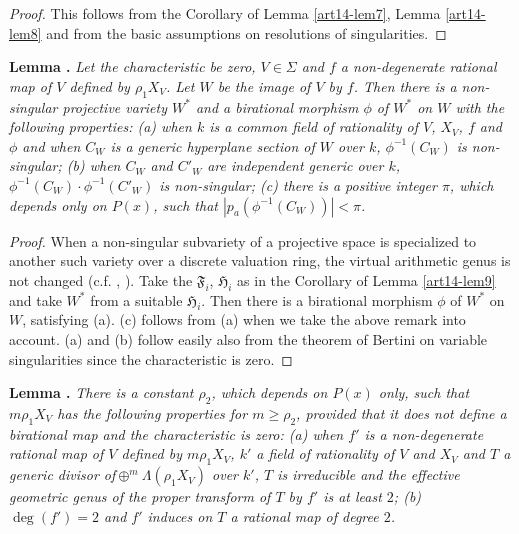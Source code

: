 \begin{proof}
This follows from the Corollary of Lemma \ref{art14-lem7}, Lemma \ref{art14-lem8} and from the basic assumptions on resolutions of singularities.
\end{proof}

\medskip
\noindent
{\bf Lemma .\label{art14-lem9}}
{\em 
Let the characteristic be zero, $V\in\Sigma$ and $f$ a non-degene\-rate rational map of $V$ defined by $\rho_{1}X_{V}$. Let $W$ be the image of $V$ by $f$. Then there is a non-singular projective variety $W^{*}$ and a birational morphism $\phi$ of $W^{*}$ on $W$ with the following properties: {\rm(a)} when $k$ is a common field of rationality of $V$, $X_{V}$, $f$ and $\phi$ and when $C_{W}$ is a generic hyperplane section of $W$ over $k$, $\phi^{-1}(C_{W})$ is non-singular; {\rm(b)} when $C_{W}$ and $C'_{W}$ are independent generic over $k$, $\phi^{-1}(C_{W})\cdot \phi^{-1}(C'_{W})$ is non-singular; {\rm(c)} there is a positive integer $\pi$, which depends only on $P(x)$, such that $|p_{a}(\phi^{-1}(C_{W}))|<\pi$.}

\begin{proof}
When a non-singular subvariety of a projective space is specialized to another such variety over a discrete valuation ring, the virtual arithmetic genus is not changed (c.f. \cite{art14-key2}, \cite{art14-key4}). Take the $\mathfrak{F}_{i}$, $\mathfrak{H}_{i}$ as in the Corollary of Lemma \ref{art14-lem9} and take $W^{*}$ from a suitable $\mathfrak{H}_{i}$. Then there is a birational morphism $\phi$ of $W^{*}$ on $W$, satisfying (a). (c) follows from (a) when we take the above remark into account. (a) and (b) follow easily also from the theorem of Bertini on variable singularities since the characteristic is zero.
\end{proof}

\smallskip
\noindent
{\bf Lemma .\label{art14-lem10}}
{\em There is a constant $\rho_{2}$, which depends on $P(x)$ only, such that $m\rho_{1}X_{V}$ has the following properties for $m\geq \rho_{2}$, provided that it does not define a birational map and the characteristic is zero: {\rm(a)} when $f'$ is a non-degenerate rational map of $V$ defined by $m\rho_{1}X_{V}$, $k'$ a field of rationality of $V$ and $X_{V}$ and $T$ a generic divisor of\pageoriginale $\oplus^{m}\Lambda(\rho_{1}X_{V})$ over $k'$, $T$ is irreducible and the effective geometric genus of the proper transform of $T$ by $f'$ is at least $2$; {\rm(b)} $\deg (f')=2$ and $f'$ induces on $T$ a rational map of degree $2$.}

